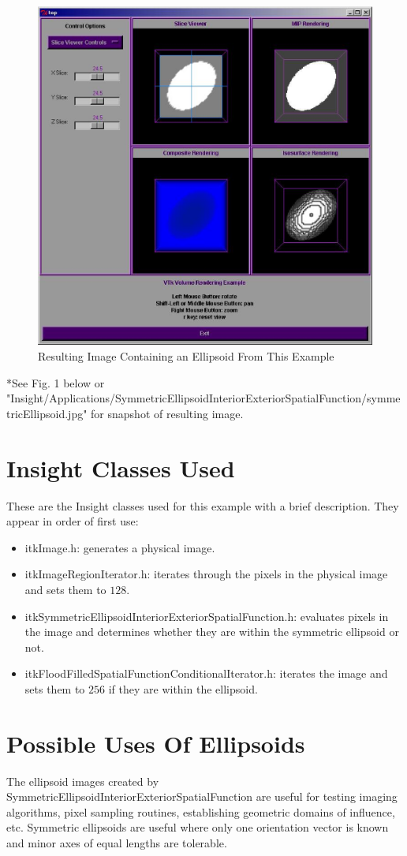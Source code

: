 \documentclass{InsightHowto}
\begin{document}
\begin{figure}[!hbp]
       \centering
       \includegraphics[width=.7\textwidth]{symmetricEllipsoid.eps}
       \caption{Resulting Image Containing an Ellipsoid From This Example \label{Fig. 1.} }
\end{figure}

*See Fig. 1 below or
"Insight/Applications/SymmetricEllipsoidInteriorExteriorSpatialFunction/symmetricEllipsoid.jpg"
for snapshot of resulting image.

\section{Insight Classes Used}

These are the Insight classes used for this example with a brief description. They appear in
order of first use:

\begin{itemize}
\item itkImage.h: generates a physical image.
\item itkImageRegionIterator.h: iterates through the pixels in the physical image and sets
them to $128$.
\item itkSymmetricEllipsoidInteriorExteriorSpatialFunction.h: evaluates pixels in the image and determines whether they are within the symmetric ellipsoid or
not.
\item itkFloodFilledSpatialFunctionConditionalIterator.h: iterates the image and sets them to $256$ if they are within the
ellipsoid.
\end{itemize}

\section{Possible Uses Of Ellipsoids}
The ellipsoid images created by SymmetricEllipsoidInteriorExteriorSpatialFunction are useful
for testing imaging algorithms, pixel sampling routines, establishing geometric domains of
influence, etc. Symmetric ellipsoids are useful where only one orientation vector is known
and minor axes of equal lengths are tolerable.
\end{document}
